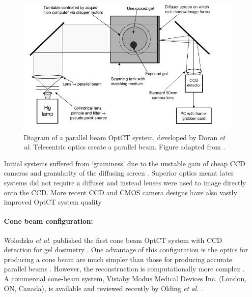\documentclass[12pt]{article}
\begin{document}
\begin{figure}[H]
\centering
\includegraphics[scale=0.6]{Doran_2001_ccdsetup.jpg}
\caption{Diagram of a parallel beam  OptCT system, developed by Doran \textit{et al.} Telecentric optics create a parallel beam.  Figure adapted from \cite{Doran:2001ee}. }
\label{fig:doran_ccd_setup}
\end{figure}



Initial systems  suffered from `graininess' due to the unstable gain of cheap CCD cameras and granularity of the diffusing screen \cite{Doran:2001ee}. Superior optics meant later systems did not require a diffuser and instead lenses were used to image directly onto the CCD. More recent CCD and CMOS camera designs have also vastly improved OptCT system quality 







\paragraph{Cone beam configuration:}
Wolodzko \textit{et al.} published the first cone beam OptCT system with CCD detection for gel dosimetry \cite{Wolodzko:1999}. One advantage of this configuration is the optics for producing a cone beam are much simpler than those for producing accurate parallel beams \cite{Doran:2008kh}. However, the reconstruction is computationally more complex \cite{hsieh2003computed}. A commercial cone-beam system, Vista\texttrademark by Modus Medical Devices Inc. (London, ON, Canada),  is available and reviewed recently by Olding \textit{et al.} \cite{Olding:2011eta}.
\end{document}
